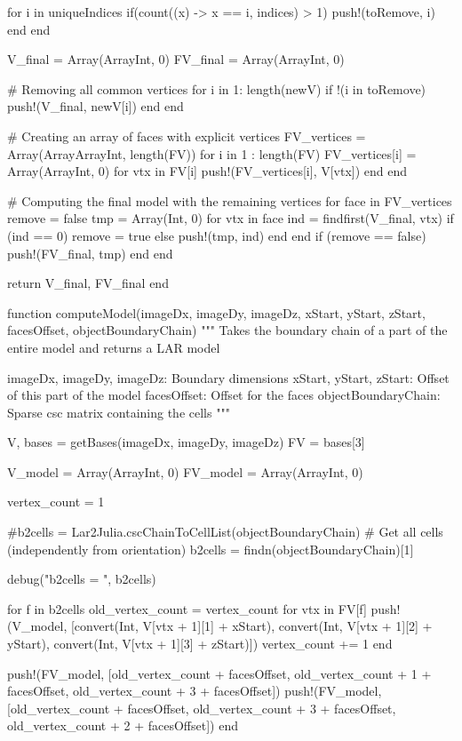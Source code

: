 \documentclass[11pt,oneside]{article}	%
\begin{document}
{  for i in uniqueIndices
    if(count((x) -> x == i, indices) > 1)
      push!(toRemove, i)
    end
  end

  V_final = Array(Array{Int}, 0)
  FV_final = Array(Array{Int}, 0)

  # Removing all common vertices
  for i in 1: length(newV)
    if !(i in toRemove)
      push!(V_final, newV[i])
    end
  end

  # Creating an array of faces with explicit vertices
  FV_vertices = Array(Array{Array{Int}}, length(FV))
  for i in 1 : length(FV)
    FV_vertices[i] = Array(Array{Int}, 0)
    for vtx in FV[i]
      push!(FV_vertices[i], V[vtx])
    end
  end

  # Computing the final model with the remaining vertices
  for face in FV_vertices
    remove = false
    tmp = Array(Int, 0)
    for vtx in face
      ind = findfirst(V_final, vtx)
      if (ind == 0)
        remove = true
      else
        push!(tmp, ind)
      end
    end
    if (remove == false)
      push!(FV_final, tmp)
    end
  end

  return V_final, FV_final
end

function computeModel(imageDx, imageDy, imageDz,
                      xStart, yStart, zStart,
                      facesOffset, objectBoundaryChain)
  """
  Takes the boundary chain of a part of the entire model
  and returns a LAR model

  imageDx, imageDy, imageDz: Boundary dimensions
  xStart, yStart, zStart: Offset of this part of the model
  facesOffset: Offset for the faces
  objectBoundaryChain: Sparse csc matrix containing the cells
  """

  V, bases = getBases(imageDx, imageDy, imageDz)
  FV = bases[3]

  V_model = Array(Array{Int}, 0)
  FV_model = Array(Array{Int}, 0)

  vertex_count = 1

  #b2cells = Lar2Julia.cscChainToCellList(objectBoundaryChain)
  # Get all cells (independently from orientation)
  b2cells = findn(objectBoundaryChain)[1]

  debug("b2cells = ", b2cells)

  for f in b2cells
    old_vertex_count = vertex_count
    for vtx in FV[f]
      push!(V_model, [convert(Int, V[vtx + 1][1] + xStart),
                    convert(Int, V[vtx + 1][2] + yStart),
                    convert(Int, V[vtx + 1][3] + zStart)])
      vertex_count += 1
    end

    push!(FV_model, [old_vertex_count + facesOffset, old_vertex_count + 1 + facesOffset, old_vertex_count + 3 + facesOffset])
    push!(FV_model, [old_vertex_count + facesOffset, old_vertex_count + 3 + facesOffset, old_vertex_count + 2 + facesOffset])
  end

}
\end{document}
